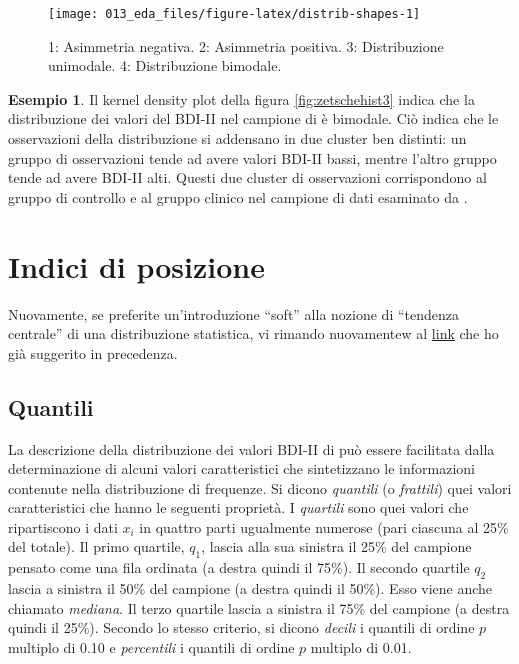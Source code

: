 \documentclass[
  11pt,
  italian,
  a4paper,
  extrafontsizes,onecolumn,openright
  ]{memoir}
\theoremstyle{definition}
\theoremstyle{definition}
\newtheorem{example}{Esempio}[chapter]
\theoremstyle{definition}
\theoremstyle{definition}
\theoremstyle{remark}
\begin{document}
\begin{figure}[h]

{\centering \texttt{[image: 013\_eda\_files/figure-latex/distrib-shapes-1]} 

}

\caption{1: Asimmetria negativa. 2: Asimmetria positiva. 3: Distribuzione unimodale. 4: Distribuzione bimodale.}\label{fig:distrib-shapes}
\end{figure}

\begin{example}
Il kernel density plot della figura \ref{fig:zetschehist3} indica che la distribuzione dei valori del BDI-II nel campione di \textcite{zetschefuture2019} è bimodale. Ciò indica che le osservazioni della distribuzione si addensano in due cluster ben distinti: un gruppo di osservazioni tende ad avere valori BDI-II bassi, mentre l'altro gruppo tende ad avere BDI-II alti. Questi due cluster di osservazioni corrispondono al gruppo di controllo e al gruppo clinico nel campione di dati esaminato da \textcite{zetschefuture2019}.
\end{example}

\hypertarget{indici-di-posizione}{%
\section{Indici di posizione}\label{indici-di-posizione}}

Nuovamente, se preferite un'introduzione ``soft'' alla nozione di ``tendenza centrale'' di una distribuzione statistica, vi rimando nuovamentew al \href{https://tinystats.github.io/teacups-giraffes-and-statistics/03_mean.html}{link} che ho già suggerito in precedenza.

\hypertarget{quantili}{%
\subsection{Quantili}\label{quantili}}

La descrizione della distribuzione dei valori BDI-II di
\textcite{zetschefuture2019} può essere facilitata dalla determinazione di
alcuni valori caratteristici che sintetizzano le informazioni contenute
nella distribuzione di frequenze. Si dicono \emph{quantili} (o \emph{frattili})
quei valori caratteristici che hanno le seguenti proprietà. I \emph{quartili}
sono quei valori che ripartiscono i dati \(x_i\) in quattro parti
ugualmente numerose (pari ciascuna al 25\% del totale). Il primo
quartile, \(q_1\), lascia alla sua sinistra il 25\% del campione pensato
come una fila ordinata (a destra quindi il 75\%). Il secondo quartile
\(q_2\) lascia a sinistra il 50\% del campione (a destra quindi il 50\%).
Esso viene anche chiamato \emph{mediana}. Il terzo quartile lascia a sinistra
il 75\% del campione (a destra quindi il 25\%). Secondo lo stesso
criterio, si dicono \emph{decili} i quantili di ordine \(p\) multiplo di 0.10 e
\emph{percentili} i quantili di ordine \(p\) multiplo di 0.01.
\end{document}
